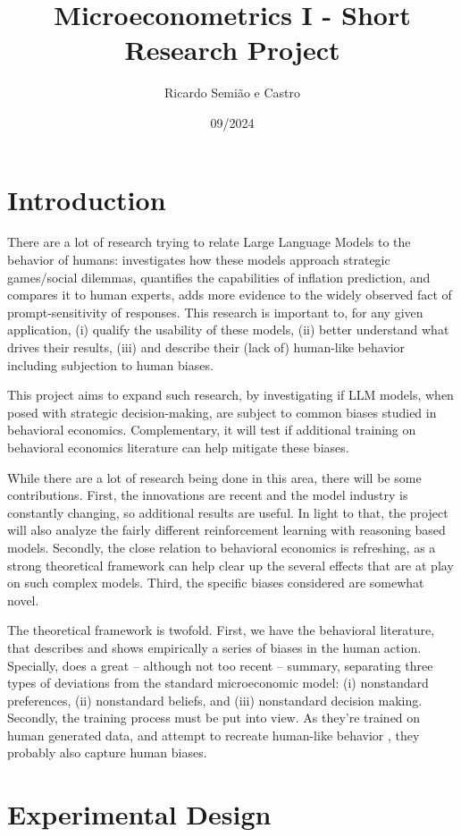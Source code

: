 \documentclass[12pt]{article}
\title{Microeconometrics I - Short Research Project}
\author{Ricardo Semião e Castro}
\date{09/2024}
\begin{document}
\section*{Introduction}

There are a lot of research trying to relate Large Language Models to the behavior of humans: \cite{lore2023} investigates how these models approach strategic games/social dilemmas, \cite{ali2024} quantifies the capabilities of inflation prediction, and compares it to human experts, \cite{tjuatja2024} adds more evidence to the widely observed fact of prompt-sensitivity of responses. This research is important to, for any given application, (i) qualify the usability of these models, (ii) better understand what drives their results, (iii) and describe their (lack of) human-like behavior including subjection to human biases.

This project aims to expand such research, by investigating if LLM models, when posed with strategic decision-making, are subject to common biases studied in behavioral economics. Complementary, it will test if additional training on behavioral economics literature can help mitigate these biases.

While there are a lot of research being done in this area, there will be some contributions. First, the innovations are recent and the model industry is constantly changing, so additional results are useful. In light to that, the project will also analyze the fairly different reinforcement learning with reasoning based models. Secondly, the close relation to behavioral economics is refreshing, as a strong theoretical framework can help clear up the several effects that are at play on such complex models. Third, the specific biases considered are somewhat novel.

The theoretical framework is twofold. First, we have the behavioral literature, that describes and shows empirically a series of biases in the human action. Specially, \cite{della2009} does a great -- although not too recent -- summary, separating three types of deviations from the standard microeconomic model: (i) nonstandard preferences, (ii) nonstandard beliefs, and (iii) nonstandard decision making. Secondly, the training process must be put into view. As they're trained on human generated data, and attempt to recreate human-like behavior \cite{naveed2024}, they probably also capture human biases.


\section*{Experimental Design}
\end{document}
